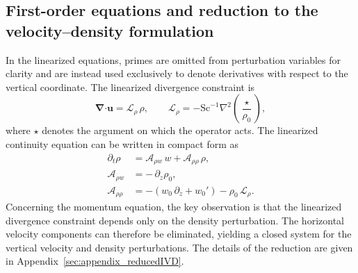 \documentclass[11pt]{article}
\newcommand{\Sch}{\mathrm{Sc}}
\newcommand{\bnabla}{\boldsymbol{\nabla}}
\newcommand{\bcdot}{\boldsymbol{\cdot}}
\begin{document}
\subsection{First-order equations and reduction to the velocity--density formulation}%
\label{subsec:first_order_equation}
In the linearized equations, primes are omitted from perturbation variables for clarity and are
instead used exclusively to denote derivatives with respect to the vertical coordinate. The
linearized divergence constraint is
\begin{equation}
    \bnabla \bcdot \boldsymbol{u} = \mathscr{L}_\rho\,\rho, \qquad
    \mathscr{L}_\rho = -\Sch^{-1}\nabla^2\!\left(\frac{\star}{\rho_0}\right),
\end{equation}
where \(\star\) denotes the argument on which the operator acts. The linearized continuity
equation can be written in compact form as
\begin{subequations}
\label{eq:linearized_density}
\begin{align}
    \partial_t \rho &= \mathscr{A}_{\rho w}\,w + \mathscr{A}_{\rho\rho}\,\rho, \\
    \mathscr{A}_{\rho w} &= -\,\partial_z \rho_0, \\
    \mathscr{A}_{\rho\rho} &= -\left(w_0\,\partial_z + w_0'\right) - \rho_0\,\mathscr{L}_\rho.
\end{align}
\end{subequations}
Concerning the momentum equation, the key observation is that the linearized divergence constraint
depends only on the density perturbation. The horizontal velocity components can therefore be
eliminated, yielding a closed system for the vertical velocity and density perturbations. The
details of the reduction are given in Appendix~\ref{sec:appendix_reducedIVD}.
\end{document}
